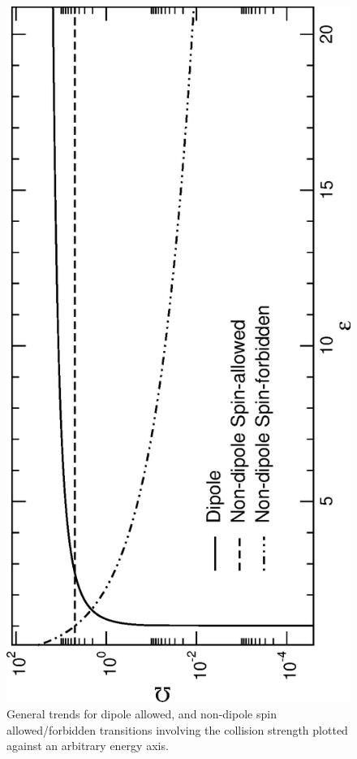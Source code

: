 %
\begin{figure}[h]
\centering
\includegraphics[scale=0.65, angle=-90]{Figures/r-matrix/collvar.eps}
\caption{General trends for dipole allowed, and non-dipole spin allowed/forbidden transitions involving the collision strength plotted against an arbitrary energy axis. \label{fig:rmat_collvariation}}
\end{figure}
%

